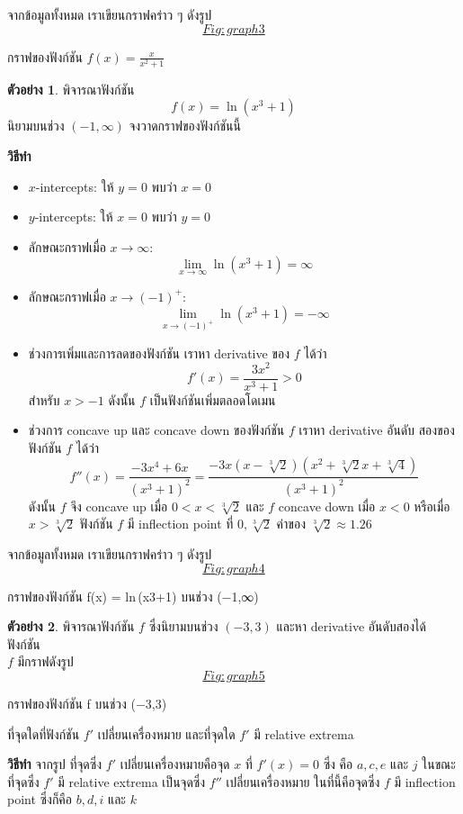 \documentclass[
]{book}
\theoremstyle{definition}
\theoremstyle{definition}
\newtheorem{example}{ตัวอย่าง}[chapter]
\theoremstyle{definition}
\theoremstyle{definition}
\theoremstyle{remark}
\begin{document}
จากข้อมูลทั้งหมด เราเขียนกราฟคร่าว ๆ
ดังรูป~\hyperref[Fig:graph3]{\[Fig:graph3\]}

กราฟของฟังก์ชัน {\(f(x) =
\frac{x}{x^2+1}\)}

\begin{example}
พิจารณาฟังก์ชัน \[f(x) = \ln(x^3+1)\] นิยามบนช่วง \((-1,\infty)\)
จงวาดกราฟของฟังก์ชันนี้
\end{example}

\textbf{วิธีทำ}

\begin{itemize}
\item
  \(x\)-intercepts: ให้ \(y=0\) พบว่า \(x=0\)
\item
  \(y\)-intercepts: ให้ \(x=0\) พบว่า \(y=0\)
\item
  ลักษณะกราฟเมื่อ \(x \to \infty\):
  \[\lim_{x\to\infty} \ln(x^3+1) = \infty\]
\item
  ลักษณะกราฟเมื่อ \(x\to (-1)^+\):
  \[\lim_{x\to (-1)^+} \ln(x^3+1) = -\infty\]
\item
  ช่วงการเพิ่มและการลดของฟังก์ชัน เราหา derivative ของ \(f\) ได้ว่า
  \[f'(x) = \frac{3x^2}{x^3+1} > 0\] สำหรับ \(x>-1\) ดังนั้น \(f\)
  เป็นฟังก์ชันเพิ่มตลอดโดเมน
\item
  ช่วงการ concave up และ concave down ของฟังก์ชัน \(f\) เราหา derivative
  อันดับ สองของฟังก์ชัน \(f\) ได้ว่า
  \[f''(x) = \frac{-3x^4+6x}{(x^3+1)^2} = \frac{-3x(x-\sqrt[3]{2})(x^2+\sqrt[3]{2}x+\sqrt[3]{4})}{(x^3+1)^2}\]
  ดังนั้น \(f\) จึง concave up เมื่อ \(0<x<\sqrt[3]{2}\) และ \(f\) concave down
  เมื่อ \(x<0\) หรือเมื่อ \(x>\sqrt[3]{2}\) ฟังก์ชัน \(f\) มี inflection point ที่
  \(0,\sqrt[3]{2}\) ค่าของ \(\sqrt[3]{2} \approx 1.26\)
\end{itemize}

จากข้อมูลทั้งหมด เราเขียนกราฟคร่าว ๆ
ดังรูป~\hyperref[Fig:graph4]{\[Fig:graph4\]}

กราฟของฟังก์ชัน {f(x) = ln (x3+1)}
บนช่วง {(−1,∞)}

\begin{example}
พิจารณาฟังก์ชัน \(f\) ซึ่งนิยามบนช่วง \((-3,3)\) และหา derivative อันดับสองได้ ฟังก์ชัน\\
\(f\) มีกราฟดังรูป~\hyperref[Fig:graph5]{\[Fig:graph5\]}

กราฟของฟังก์ชัน {f}
บนช่วง {(−3,3)}

ที่จุดใดที่ฟังก์ชัน \(f'\) เปลี่ยนเครื่องหมาย และที่จุดใด \(f'\) มี relative extrema
\end{example}

\textbf{วิธีทำ} จากรูป ที่จุดซึ่ง \(f'\) เปลี่ยนเครื่องหมายคือจุด \(x\) ที่ \(f'(x) = 0\) ซึ่ง คือ
\(a, c, e\) และ \(j\) ในขณะที่จุดซึ่ง \(f'\) มี relative extrema เป็นจุดซึ่ง \(f''\)
เปลี่ยนเครื่องหมาย ในที่นี้คือจุดซึ่ง \(f\) มี inflection point ซึ่งก็คือ \(b, d, i\) และ \(k\)
\end{document}
